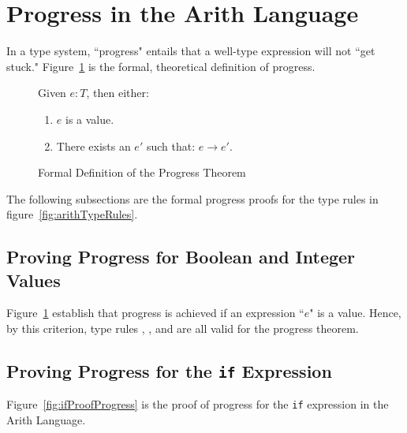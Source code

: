 \documentclass{report}
\newcommand{\rel}[1]{\mbox{\sc [#1]}}
\begin{document}
\eject
\section{Progress in the Arith Language}\label{sec:progress}

In a type system, ``progress" entails that a well-type expression will not ``get stuck."  Figure~\ref{fig:progressTheorem} is the formal, theoretical definition of progress.

\begin{figure}[H]

	Given $e : T$, then either:
	
	\begin{enumerate}
	
      \item $e$ is a value.
      
      \item There exists an $e'$ such that: $e \rightarrow e'$.
	
	\end{enumerate}
	
  \caption{Formal Definition of the Progress Theorem}\label{fig:progressTheorem}
\end{figure}

The following subsections are the formal progress proofs for the type rules in figure~\ref{fig:arithTypeRules}.

\subsection{Proving Progress for Boolean and Integer Values}

Figure~\ref{fig:progressTheorem} establish that progress is achieved if an expression ``$e$" is a value.  Hence, by this criterion, type rules \rel{T-True}, \rel{T-False}, and \rel{T-Int} are all valid for the progress theorem.

\subsection{Proving Progress for the \texttt{if} Expression}

Figure~\ref{fig:ifProofProgress} is the proof of progress for the \texttt{if} expression in the Arith Language.
\end{document}
